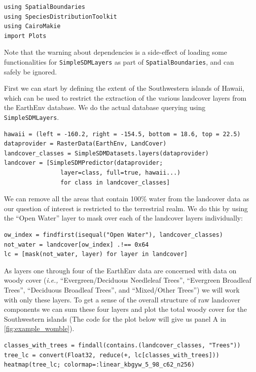 \begin{refsection}
\begin{verbatim}
using SpatialBoundaries
using SpeciesDistributionToolkit
using CairoMakie
import Plots
\end{verbatim}

Note that the warning about dependencies is a side-effect of loading
some functionalities for \texttt{SimpleSDMLayers} as part of
\texttt{SpatialBoundaries}, and can safely be ignored.

First we can start by defining the extent of the Southwestern islands of
Hawaii, which can be used to restrict the extraction of the various
landcover layers from the EarthEnv database. We do the actual database
querying using \texttt{SimpleSDMLayers}.

\begin{verbatim}
hawaii = (left = -160.2, right = -154.5, bottom = 18.6, top = 22.5)
dataprovider = RasterData(EarthEnv, LandCover)
landcover_classes = SimpleSDMDatasets.layers(dataprovider)
landcover = [SimpleSDMPredictor(dataprovider; 
                layer=class, full=true, hawaii...) 
                for class in landcover_classes]
\end{verbatim}

We can remove all the areas that contain 100\% water from the landcover
data as our question of interest is restricted to the terrestrial realm.
We do this by using the ``Open Water'' layer to mask over each of the
landcover layers individually:

\begin{verbatim}
ow_index = findfirst(isequal("Open Water"), landcover_classes)
not_water = landcover[ow_index] .!== 0x64
lc = [mask(not_water, layer) for layer in landcover]
\end{verbatim}

As layers one through four of the EarthEnv data are concerned with data
on woody cover (\emph{i.e.,} ``Evergreen/Deciduous Needleleaf Trees'',
``Evergreen Broadleaf Trees'', ``Deciduous Broadleaf Trees'', and
``Mixed/Other Trees'') we will work with only these layers. To get a
sense of the overall structure of raw landcover components we can sum
these four layers and plot the total woody cover for the Southwestern
islands (The code for the plot below will give us panel A in
\autoref{fig:example_womble}).

\begin{verbatim}
classes_with_trees = findall(contains.(landcover_classes, "Trees"))
tree_lc = convert(Float32, reduce(+, lc[classes_with_trees]))
heatmap(tree_lc; colormap=:linear_kbgyw_5_98_c62_n256)
\end{verbatim}


\end{refsection}
